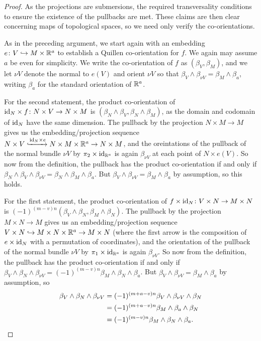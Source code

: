 \begin{proof}
	As the projections are submersions, the required transversality conditions to ensure the existence of the pullbacks are met.
	These claims are then clear concerning maps of topological spaces, so we need only verify the co-orientations.

	As in the preceding argument, we start again with an embedding $e \colon V \hookrightarrow M \times \mathbb{R}^a$ to establish a Quillen co-orientation for $f$.
	We again may assume $a$ be even for simplicity.
	We write the co-orientation of $f$ as $(\beta_V,\beta_M)$, and we let $\nu V$ denote the normal to $e(V)$ and orient $\nu V$ so that $\beta_V \wedge \beta_{\nu V} = \beta_M \wedge \beta_a$, writing $\beta_a$ for the standard orientation of $\mathbb{R}^a$.

	For the second statement, the product co-orientation of $\mathrm{id}_N \times f \colon N \times V \to N \times M$ is $(\beta_N \wedge \beta_V,\beta_N \wedge \beta_M)$, as the domain and codomain of $\mathrm{id}_N$ have the same dimension.
	The pullback by the projection $N \times M \to M$ gives us the embedding/projection sequence $N \times V\xhookrightarrow{\mathrm{id}_N \times e} N \times M \times \mathbb{R}^a \to N \times M$, and the oreintations of the pullback of the normal bundle $\nu V$ by $\pi_2 \times \mathrm{id}_{\mathbb{R}^a}$ is again $\beta_{\nu V}$ at each point of $N \times e(V)$.
	So now from the definition, the pullback has the product co-orientation if and only if $\beta_N \wedge \beta_V \wedge \beta_{\nu V} = \beta_N \wedge \beta_M \wedge \beta_a$.
	But $ \beta_V \wedge \beta_{\nu V} = \beta_M \wedge \beta_a$ by assumption, so this holds.

	For the first statement, the product co-orientation of $f \times \mathrm{id}_N \colon V \times N \to M \times N$ is $(-1)^{(m-v)n}(\beta_V \wedge \beta_N,\beta_M \wedge \beta_N)$.
	The pullback by the projection $M \times N \to M$ gives us an embedding/projection sequence $V \times N \hookrightarrow M \times N \times \mathbb{R}^a \to M \times N$ (where the first arrow is the composition of $e \times \mathrm{id}_N$ with a permutation of coordinates), and the orientation of the pullback of the normal bundle $\nu V$ by $\pi_1 \times \mathrm{id}_{\mathbb{R}^a}$ is again $\beta_{\nu V}$.
	So now from the definition, the pullback has the product co-orientation if and only if $\beta_V \wedge \beta_N \wedge \beta_{\nu V} = (-1)^{(m-v)n}\beta_M \wedge \beta_N \wedge \beta_a$.
	But $ \beta_V \wedge \beta_{\nu V} = \beta_M \wedge \beta_a$ by assumption, so
	\begin{align*}
		\beta_V \wedge \beta_N \wedge \beta_{\nu V}& = (-1)^{(m+a-v)n}\beta_V \wedge \beta_{\nu V} \wedge \beta_N\\
		& = (-1)^{(m+a-v)n}\beta_M \wedge \beta_a \wedge \beta_N\\
		& = (-1)^{(m-v)n}\beta_M \wedge \beta_N \wedge \beta_a.\qedhere
	\end{align*}
\end{proof}

